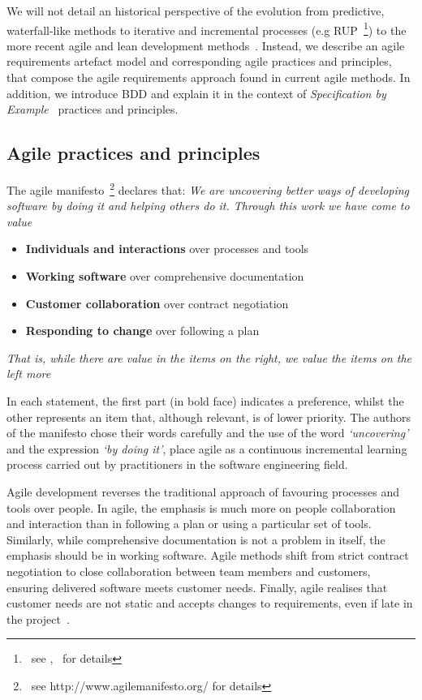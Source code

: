 \documentclass[dissertation,final]{softeng}
\begin{document}
We will not detail an historical perspective of the evolution from predictive, waterfall-like methods to iterative and incremental processes (e.g RUP~\footnote{~see ,~\citet{Kruchten2003} for details}) to the more recent agile and lean development methods~\citep{Leffingwell2011,Larman2003}. Instead, we describe an agile requirements artefact model and corresponding agile practices and principles, that compose the agile requirements approach found in current agile methods. In addition, we introduce BDD and explain it in the context of \emph{Specification by Example}~\citep{Adzic201106} practices and principles.

\subsection{Agile practices and principles}
The agile manifesto~\footnote{~see http://www.agilemanifesto.org/ for details} declares that: 
\emph{We are uncovering better ways of developing software by doing it and helping others do it. Through this work we have come to value}

\begin{itemize}
\item \textbf{Individuals and interactions} over processes and tools
\item \textbf{Working software} over comprehensive documentation
\item \textbf{Customer collaboration} over contract negotiation
\item \textbf{Responding to change} over following a plan
\end{itemize}
\emph{That is, while there are value in the items on the right, we value the items on the left more}

In each statement, the first part (in bold face) indicates a preference, whilst the other represents an item that, although relevant, is of lower priority. The authors of the manifesto chose their words carefully and the use of the word \emph{`uncovering'} and the expression \emph{`by doing it'}, place agile as a continuous incremental learning process carried out by practitioners in the software engineering field.

Agile development reverses the traditional approach of favouring processes and tools over people. In agile, the emphasis is much more on people collaboration and interaction than in following a plan or using a particular set of tools. Similarly, while comprehensive documentation is not a problem in itself, the emphasis should be in working software. Agile methods shift from strict contract negotiation to close collaboration between team members and customers, ensuring delivered software meets customer needs. Finally, agile realises that customer needs are not static and accepts changes to requirements, even if late in the project~\citep{Highsmith:2000:ASD:323922}. 
\end{document}
